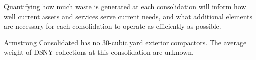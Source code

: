 
    Quantifying how much waste is generated at each consolidation will inform how well current assets and services serve current needs, and what additional elements are necessary for each consolidation to operate as efficiently as possible.
    
    Armstrong Consolidated has no 30-cubic yard exterior compactors. The average weight of DSNY collections at this consolidation are unknown.